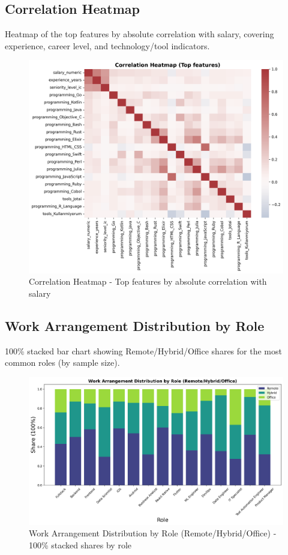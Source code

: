 \documentclass[12pt,a4paper]{article}
\begin{document}
\subsection{Correlation Heatmap}
Heatmap of the top features by absolute correlation with salary, covering experience, career level, and technology/tool indicators.


\begin{figure}[H]
    \centering
    \includegraphics[width=\textwidth]{figures/heatmap_correlation.png}
    \caption{Correlation Heatmap - Top features by absolute correlation with salary}
\end{figure}

\subsection{Work Arrangement Distribution by Role}

100\% stacked bar chart showing Remote/Hybrid/Office shares for the most common roles (by sample size).

\begin{figure}[H]
    \centering
    \includegraphics[width=\textwidth]{figures/barplot_work_arrangement_by_role.png}
    \caption{Work Arrangement Distribution by Role (Remote/Hybrid/Office) - 100\% stacked shares by role}
\end{figure}
\end{document}
